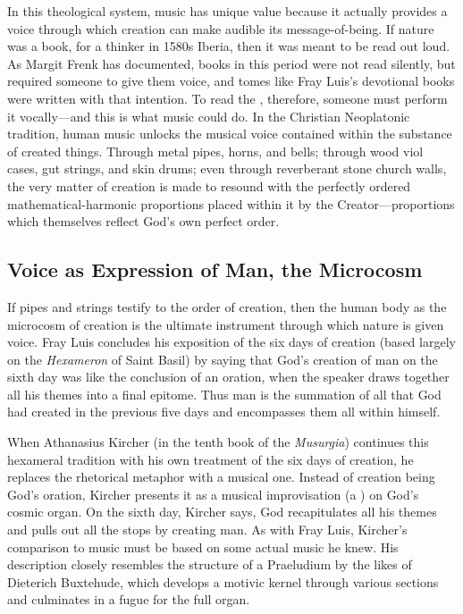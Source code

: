 In this theological system, music has unique value because it actually provides
a voice through which creation can make audible its message-of-being.
If nature was a book, for a thinker in 1580s Iberia, then it was meant to be
read out loud.
As Margit Frenk has documented, books in this period were not read silently,
but required someone to give them voice, and tomes like Fray Luis's devotional
books were written with that intention.%
    \Autocite{Frenk:Voz}
To read the , therefore, someone must perform it
vocally---and this is what music could do.
In the Christian Neoplatonic tradition, human music unlocks the musical voice
contained within the substance of created things.
Through metal pipes, horns, and bells; through wood viol cases, gut strings,
and skin drums; even through reverberant stone church walls, the very matter of
creation is made to resound with the perfectly ordered mathematical-harmonic
proportions placed within it by the Creator---proportions which themselves
reflect God's own perfect order.


\subsection{Voice as Expression of Man, the Microcosm}

If pipes and strings testify to the order of creation, then the human body as
the microcosm of creation is the ultimate instrument through which nature is
given voice.
Fray Luis concludes his exposition of the six days of creation (based largely
on the \emph{Hexameron} of Saint Basil) by saying that God's creation of man on
the sixth day was like the conclusion of an oration, when the speaker draws
together all his themes into a final epitome.
Thus man is the summation of all that God had created in the previous five days
and encompasses them all within himself.%
    \Autocite[243]{LuisdeGranada:Simbolo}


When Athanasius Kircher (in the tenth book of the \emph{Musurgia}) continues
this hexameral tradition with his own treatment of the six days of creation, he
replaces the rhetorical metaphor with a musical one.
Instead of creation being God's oration, Kircher presents it as a musical
improvisation (a ) on God's cosmic organ.%
    \Autocite[, 366--367]{Kircher:Musurgia}
On the sixth day, Kircher says, God recapitulates all his themes and pulls out
all the stops by creating man.
As with Fray Luis, Kircher's comparison to music must be based on some actual
music he knew. 
His description closely resembles the structure of a Praeludium by the
likes of Dieterich Buxtehude, which develops a motivic kernel through various
sections and culminates in a fugue for the full organ.

